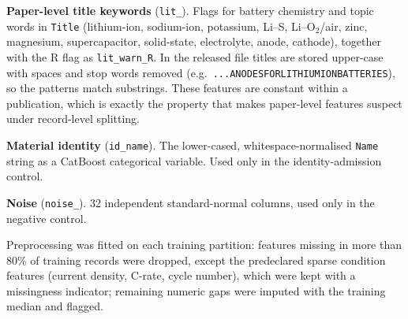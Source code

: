 \documentclass[journal=jcisd8,manuscript=article,layout=traditional]{achemso}
\begin{document}
\textbf{Paper-level title keywords} (\texttt{lit\_}). Flags for battery chemistry and topic words in \texttt{Title} (lithium-ion, sodium-ion, potassium, Li--S, Li--O$_2$/air, zinc, magnesium, supercapacitor, solid-state, electrolyte, anode, cathode), together with the R flag as \texttt{lit\_warn\_R}. In the released file titles are stored upper-case with spaces and stop words removed (e.g.\ \texttt{...ANODESFORLITHIUMIONBATTERIES}), so the patterns match substrings. These features are constant within a publication, which is exactly the property that makes paper-level features suspect under record-level splitting.

\textbf{Material identity} (\texttt{id\_name}). The lower-cased, whitespace-normalised \texttt{Name} string as a CatBoost categorical variable. Used only in the identity-admission control.

\textbf{Noise} (\texttt{noise\_}). 32 independent standard-normal columns, used only in the negative control.

Preprocessing was fitted on each training partition: features missing in more than 80\% of training records were dropped, except the predeclared sparse condition features (current density, C-rate, cycle number), which were kept with a missingness indicator; remaining numeric gaps were imputed with the training median and flagged.
\end{document}
